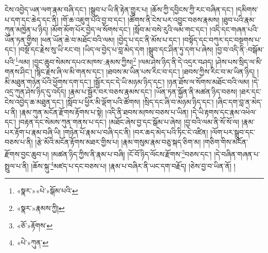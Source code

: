 ངེས་འབྱེད་ཡན་ལག་རྣམ་བཞི་དང་། །སྒྲུབ་པ་ཡི་ནི་རྟེན་གྱུར་པ། །ཆོས་ཀྱི་དབྱིངས་ཀྱི་རང་བཞིན་དང་། །དམིགས་པ་དག་དང་ཆེད་དང་ནི། །གོ་ཆ་འཇུག་པའི་བྱ་བ་དང་། །ཚོགས་ནི་ངེས་པར་འབྱུང་བཅས་རྣམས། །ཐུབ་པའི་རྣམ་ཀུན་མཁྱེན་པ་ཉིད། །མོག་མོག་པོར་བྱེད་ལ་སོགས་དང་། །སློབ་མ་བསེ་རུའི་ལམ་གང་དང་། །འདི་དང་གཞན་པའི་ཡོན་ཏན་གྱིས། །ཕན་ཡོན་ཆེ་བ་མཐོང་བའི་ལམ། །བྱེད་པ་དང་ནི་མོས་པ་དང་། །བསྟོད་དང་བཀུར་དང་བསྔགས་པ་དང་། །བསྔོ་དང་རྗེས་སུ་ཡི་རང་བ། །ཡིད་ལ་བྱེད་པ་བླ་མེད་དག །སྒྲུབ་དང་ཤིན་ཏུ་དག་པ་ཞེས། །བྱ་བ་འདི་ནི་:བསྒོམ་པའི་\footnote{«སྣར་»«པེ་»སྒོམ་པའི་}ལམ། །བྱང་ཆུབ་སེམས་དཔའ་མཁས་:རྣམས་ཀྱིས།\footnote{«སྣར་»རྣམས་ཀྱི།} །ལམ་ཤེས་ཉིད་ནི་དེ་འདྲར་བཤད། །ཤེས་པས་སྲིད་ལ་མི་གནས་ཤིང་། །སྙིང་རྗེས་ཞི་ལ་མི་གནས་དང་། །ཐབས་མ་ཡིན་པས་རིང་བ་དང་། །ཐབས་ཀྱིས་རིང་བ་མ་ཡིན་ཉིད། །མི་མཐུན་གཉེན་པོའི་ཕྱོགས་དག་དང་། །སྦྱོར་དང་དེ་ཡི་མཉམ་ཉིད་དང་། །ཉན་ཐོས་ལ་སོགས་མཐོང་བའི་ལམ། །དེ་འདྲ་ཀུན་ཤེས་ཉིད་དུ་འདོད། །རྣམ་པ་སྦྱོར་བར་བཅས་རྣམས་དང་། །ཡོན་ཏན་སྐྱོན་ནི་མཚན་ཉིད་བཅས། །ཐར་དང་ངེས་འབྱེད་ཆ་མཐུན་དང་། །སློབ་པ་ཕྱིར་མི་ལྡོག་པའི་ཚོགས། །སྲིད་དང་ཞི་བ་མཉམ་ཉིད་དང་། །ཞིང་དག་བླ་ན་མེད་པ་ནི། །རྣམ་ཀུན་མངོན་རྫོགས་རྟོགས་པ་སྟེ། །འདི་ནི་ཐབས་མཁས་བཅས་པ་ཡིན། །དེ་ཡི་རྟགས་དང་རྣམ་འཕེལ་དང་། །བརྟན་དང་སེམས་ཀུན་གནས་པ་དང་། །མཐོང་ཞེས་བྱ་དང་སྒོམ་པ་ཞེས། །བྱ་བའི་ལམ་ནི་སོ་སོ་ལ། །རྣམ་པར་རྟོག་པ་རྣམ་བཞི་ཡི། །གཉེན་པོ་རྣམ་པ་བཞི་དང་ནི། །བར་ཆད་མེད་པའི་ཏིང་ངེ་འཛིན། །ལོག་པར་སྒྲུབ་དང་བཅས་པ་ནི། །རྩེ་མོའི་མངོན་རྟོགས་མཐར་གྱིས་པ། །རྣམ་གསུམ་རྣམ་བཅུ་སྐད་ཅིག་མ། །གཅིག་གིས་མངོན་རྫོགས་བྱང་ཆུབ་པ། །མཚན་ཉིད་ཀྱིས་ནི་རྣམ་པ་བཞི། །ངོ་བོ་ཉིད་ལོངས་རྫོགས་\footnote{«ཅོ་»རྟོགས་}བཅས་དང་། །དེ་བཞིན་གཞན་པ་སྤྲུལ་པ་ནི། །ཆོས་སྐུ་\footnote{«པེ་»ཀུན་}མཛད་པ་དང་བཅས་པ། །རྣམ་པ་བཞིར་ནི་ཡང་དག་བརྗོད། །ཅེས་བྱ་བ་ཡིན་ནོ། །
